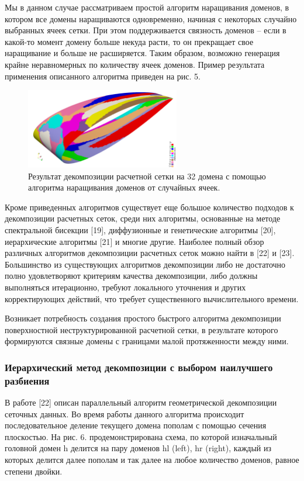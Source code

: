 Мы в данном случае рассматриваем простой алгоритм наращивания доменов, в котором все домены наращиваются одновременно, начиная с некоторых случайно выбранных ячеек сетки.
При этом поддерживается связность доменов -- если в какой-то момент домену больше некуда расти, то он прекращает свое наращивание и больше не расширяется.
Таким образом, возможно генерация крайне неравномерных по количеству ячеек доменов. Пример результата применения описанного алгоритма приведен на рис. 5.

\begin{figure}[ht]
	\centering
		\includegraphics[width=0.6\textwidth]{./pics/text_2_decompsurf/wing_rgrow_32.png}
	\caption{Результат декомпозиции расчетной сетки на 32 домена с помощью алгоритма наращивания доменов от случайных ячеек.}
	\label{fig:text_2_decompsurf_wing_rgrow_32}
\end{figure}

Кроме приведенных алгоритмов существует еще большое количество подходов к декомпозиции расчетных сеток, среди них алгоритмы, основанные на методе спектральной бисекции [19], диффузионные и генетические алгоритмы [20], иерархические алгоритмы [21] и многие другие.
Наиболее полный обзор различных алгоритмов декомпозиции расчетных сеток можно найти в [22] и [23].
Большинство из существующих алгоритмов декомпозиции либо не достаточно полно удовлетворяют критериям качества декомпозиции, либо должны выполняться итерационно, требуют локального уточнения и других корректирующих действий, что требует существенного вычислительного времени.

Возникает потребность создания простого быстрого алгоритма декомпозиции поверхностной неструктурированной расчетной сетки, в результате которого формируются связные домены с границами малой протяженности между ними.

\subsubsection{Иерархический метод декомпозиции с выбором наилучшего разбиения}

В работе [22] описан параллельный алгоритм геометрической декомпозиции сеточных данных.
Во время работы данного алгоритма происходит последовательное деление текущего домена пополам с помощью сечения плоскостью.
На рис. 6. продемонстрирована схема, по которой изначальный головной домен h делится на пару доменов hl (left), hr (right), каждый из которых делится далее пополам и так далее на любое количество доменов, равное степени двойки.

